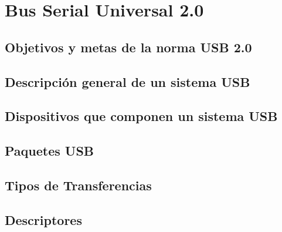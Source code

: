 \chapter{Bus Serial Universal 2.0}
	\label{cap:usb}
	
		\section{Objetivos y metas de la norma USB 2.0}
			\label{usb:obj}
			
		\section{Descripción general de un sistema USB}
			\label{usb:desc}
			
		\section{Dispositivos que componen un sistema USB}
			\label{usb:disp}
			
		\section{Paquetes USB}
			\label{usb:pkt}
			
		\section{Tipos de Transferencias}
			\label{usb:xfer}
			
		\section{Descriptores}
			\label{usb:dscr}
			
